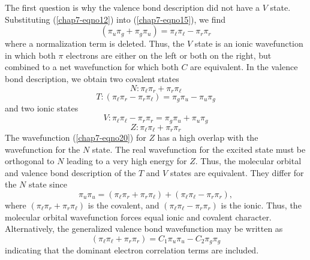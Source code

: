 The first question is why the valence bond description did not have a
$V$ state. Substituting (\ref{chap7-eqno12}) into
(\ref{chap7-eqno15}), we find
\begin{equation}
\left( \pi_u \pi_g + \pi_g \pi_u \right) = \pi_{\ell} \pi_{\ell} - 
\pi_r \pi_r
\end{equation}
where a normalization term is deleted.  Thus, the $V$ state is an 
ionic wavefunction in which both $\pi$ electrons are either on the left 
or both on the right, but combined to a net wavefunction for which 
both $C$ are equivalent.  In the valence bond description, we obtain 
two covalent states
\begin{equation}
N : \pi_{\ell} \pi_r + \pi_r \pi_{\ell}
\label{chap07-eqno24}
\end{equation}
\begin{equation}
T : \left( \pi_{\ell} \pi_r - \pi_r \pi_{\ell} \right) = \pi_g 
\pi_u - \pi_u \pi_g
\label{chap07-eqno25}
\end{equation}
and two ionic states
\begin{equation}
V : \pi_{\ell} \pi_{\ell} - \pi_r \pi_r = \pi_g \pi_u + \pi_u 
\pi_g
\label{chap07-eqno26}
\end{equation}
\begin{equation}
Z : \pi_{\ell} \pi_{\ell} + \pi_r \pi_r
\label{chap07-eqno27}
\end{equation}
The wavefunction (\ref{chap7-eqno20}) for $Z$ has a high overlap with
the wavefunction for the $N$ state.  The real wavefunction for the
excited state must be orthogonal to $N$ leading to a very high energy
for $Z$.  Thus, the molecular orbital and valence bond description of
the $T$ and $V$ states are equivalent. They differ for the $N$ state
since
\begin{equation}
\pi_u \pi_u = \left( \pi_{\ell} \pi_r + \pi_r \pi_{\ell} \right) + 
\left( \pi_{\ell} \pi_{\ell} - \pi_r \pi_r \right),
\label{chap07-eqno28}
\end{equation}
where $(\pi_{\ell} \pi_r + \pi_r \pi_{\ell})$ is the covalent, and 
$(\pi_{\ell} \pi_{\ell} - \pi_r \pi_r)$ is the ionic.  Thus, 
the molecular orbital wavefunction forces equal ionic and covalent 
character.  Alternatively, the generalized valence bond wavefunction 
may be written as
\begin{equation}
\left( \pi_{\ell} \pi_{\ell} + \pi_r \pi_r \right) = C_1 \pi_u 
\pi_u - C_2 \pi_g \pi_g
\label{chap07-eqno29}
\end{equation}
indicating that the dominant electron correlation terms are included.

